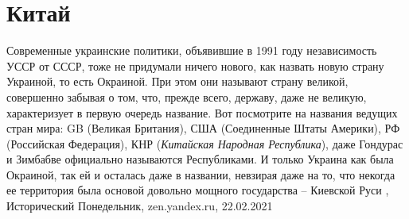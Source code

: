  
 
 
 
 
\chapter{Китай}
\label{sec:slova.kitaj}

Современные украинские политики, объявившие в 1991 году независимость УССР от
СССР, тоже не придумали ничего нового, как назвать новую страну Украиной, то
есть Окраиной. При этом они называют страну великой, совершенно забывая о том,
что, прежде всего, державу, даже не великую, характеризует в первую очередь
название. Вот посмотрите на названия ведущих стран мира: GB (Великая
Британия), США (Соединенные Штаты Америки), РФ (Российская Федерация), КНР
(\emph{Китайская Народная Республика}), даже Гондурас и Зимбабве официально называются
Республиками. И только Украина как была Окраиной, так ей и осталась даже в
названии, невзирая даже на то, что некогда ее территория была основой довольно
мощного государства – Киевской Руси
, 
Исторический Понедельник, zen.yandex.ru, 22.02.2021 

